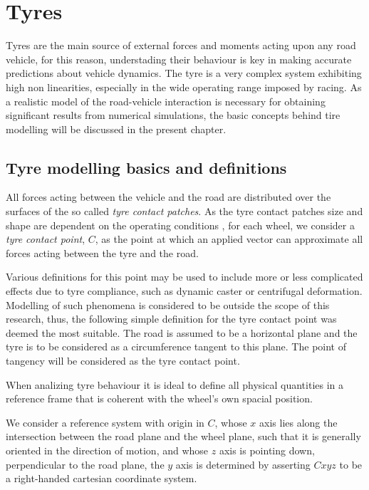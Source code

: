 \chapter{Tyres}
\label{chap:tyres}
Tyres are the main source of external forces and moments acting upon any road vehicle, for this reason, understading their behaviour is key in making accurate predictions about vehicle dynamics. The tyre is a very complex system exhibiting high non linearities, especially in the wide operating range imposed by racing. As a realistic model of the road-vehicle interaction is necessary for obtaining significant results from numerical simulations, the basic concepts behind tire modelling will be discussed in the present chapter.
\section{Tyre modelling basics and definitions}
\label{sec:tyrebasics}
All forces acting between the vehicle and the road are distributed over the surfaces of the so called \textit{tyre contact patches}. As the tyre contact patches size and shape are dependent on the operating conditions , for each wheel, we consider a \textit{tyre contact point}, $C$, as the point at which an applied vector can approximate all forces acting between the tyre and the road.

Various definitions for this point may be used to include more or less complicated effects due to tyre compliance, such as dynamic caster or centrifugal deformation.
Modelling of such phenomena is considered to be outside the scope of this research, thus, the following simple definition for the tyre contact point was deemed the most suitable. The road is assumed to be a horizontal plane and the tyre is to be considered as a circumference tangent to this plane.  The point of tangency will be considered as the tyre contact point.

When analizing tyre behaviour it is ideal to define all physical quantities in a reference frame that is coherent with the wheel's own spacial position.

We consider a reference system  with origin in $C$, whose $x$ axis lies along the intersection between the road plane and the wheel plane, such that it is generally oriented in the direction of motion, and whose $z$ axis is pointing down, perpendicular to the road plane, the $y$ axis is determined by asserting $Cxyz$ to be a right-handed cartesian coordinate system.

